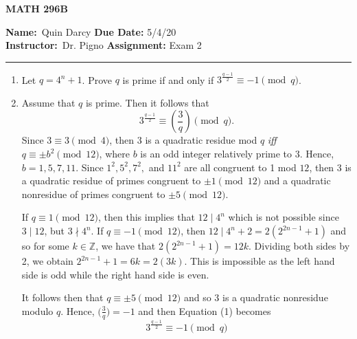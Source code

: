\documentclass[12pt]{article}
\makeatletter
\theoremstyle{definition}
\theoremstyle{remark}
\renewenvironment{proof}[1][\proofname]{\par
  \pushQED{\qed}%
  \normalfont \topsep6\p@\@plus6\p@\relax
  \list{}{\leftmargin=0mm
          \rightmargin=4mm
          \settowidth{\itemindent}{\itshape#1}%
          \labelwidth=\itemindent
          \parsep=0pt \listparindent=\parindent 
  }
  \item[\hskip\labelsep
        \itshape
    #1\@addpunct{.}]\ignorespaces
}{%
  \popQED\endlist\@endpefalse
}
\let\oldproofname=\proofname
\renewcommand{\proofname}{\bf{\textit{\oldproofname}}}
\makeatother
\begin{document}
\thispagestyle{empty}\hline

\begin{center}
	\vspace{.4cm} {\textbf { \large MATH 296B}}
\end{center}
{\textbf{Name:}\ Quin Darcy \hspace{\fill} \textbf{Due Date:} 5/4/20   \\
{ \textbf{Instructor:}}\ Dr. Pigno \hspace{\fill} \textbf{Assignment:} Exam 2 \\ \hrule}

\justifying

    \begin{enumerate}[leftmargin=*]
        \item Let $q=4^n+1$. Prove $q$ is prime if and only if $3^{\frac{q-1}{2}}\equiv-1\pmod{q}$.
            \begin{proof}
                Assume that $q$ is prime. Then it follows that 
                    \begin{equation}
                        3^{\frac{q-1}{2}}\equiv\left(\frac{3}{q}\right)\pmod{q}.
                    \end{equation}
                Since $3\equiv 3\pmod{4}$, then $3$ is a quadratic residue mod $q$ \emph{iff} $q\equiv\pm b^2\pmod{12}$, where $b$ is an odd integer relatively prime to $3$. Hence, $b=1,5,7,11$. Since $1^2,5^2,7^2,$ and $11^2$ are all congruent to 1 mod $12$, then 3 is a quadratic residue of primes congruent to $\pm 1\pmod{12}$ and a quadratic nonresidue of primes congruent to $\pm 5\pmod{12}$.\par\hspace{4mm} If $q\equiv 1\pmod{12}$, then this implies that $12\mid 4^n$ which is not possible since $3\mid 12$, but $3\nmid 4^n$. If $q\equiv-1\pmod{12}$, then $12\mid 4^n+2=2(2^{2n-1}+1)$ and so for some $k\in\mathbb{Z}$, we have that $2(2^{2n-1}+1)=12k$. Dividing both sides by 2, we obtain $2^{2n-1}+1=6k=2(3k)$. This is impossible as the left hand side is odd while the right hand side is even.\par\hspace{4mm} It follows then that $q\equiv\pm 5\pmod{12}$ and so $3$ is a quadratic nonresidue modulo $q$. Hence, $\big(\frac{3}{q}\big)=-1$ and then Equation (1) becomes
                    \begin{equation*}
                        3^{\frac{q-1}{2}}\equiv-1\pmod{q}
                    \end{equation*}

\end{proof}
\end{enumerate}
\end{document}
